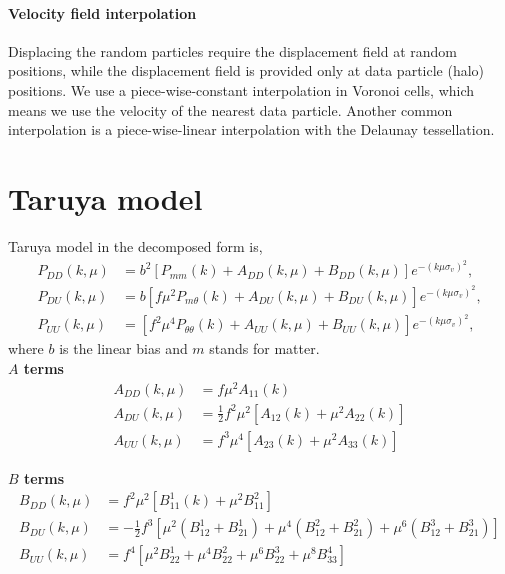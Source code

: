 \documentclass[a4paper,11pt, fleqn]{article}
\begin{document}
\paragraph{Velocity field interpolation}

Displacing the random particles require the displacement field at
random positions, while the displacement field is provided only at
data particle (halo) positions. We use a piece-wise-constant
interpolation in Voronoi cells, which means we use the velocity of the
nearest data particle. Another common interpolation is a
piece-wise-linear interpolation with the Delaunay tessellation.


%
%
\newpage
\section{Taruya model}

\vspace{5mm}

Taruya model in the decomposed form is,\vspace{-2mm}
\begin{align}
  P_{DD}(k, \mu) &= b^2 \left[
    P_{mm}(k) + A_{DD}(k, \mu) + B_{DD}(k, \mu)
    \right] e^{- (k\mu\sigma_v)^2},\\
  P_{DU}(k, \mu) &= b \left[
    f\mu^2 P_{m\theta}(k) + A_{DU}(k, \mu) + B_{DU}(k, \mu)
    \right] e^{- (k\mu\sigma_v)^2},\\
  P_{UU}(k, \mu) &= \left[
    f^2 \mu^4 P_{\theta\theta}(k) + A_{UU}(k, \mu) + B_{UU}(k, \mu)
    \right] e^{- (k\mu\sigma_v)^2},   
\end{align}
where $b$ is the linear bias and $m$ stands for matter.\\


\textbf{$A$ terms}\vspace{-2mm}
\begin{align}
  A_{DD}(k, \mu) &= f\mu^2 A_{11}(k)\\
  A_{DU}(k, \mu) &= \frac{1}{2} f^2 \mu^2 \left[
                   A_{12}(k) + \mu^2 A_{22}(k) \right]\\
  A_{UU}(k, \mu) &= f^3 \mu^4 \left[ A_{23}(k) + \mu^2 A_{33}(k) \right]
\end{align}

\textbf{$B$ terms}\vspace{-2mm}
\begin{align}
  B_{DD}(k, \mu) &= f^2 \mu^2 \left[ B^1_{11}(k) + \mu^2 B^2_{11} \right]\\
  B_{DU}(k, \mu) &= -\frac{1}{2} f^3 \left[
    \mu^2( B^1_{12} + B^1_{21} ) + \mu^4(B^2_{12} + B^2_{21})
    + \mu^6(B^3_{12} + B^3_{21}) \right]\\
  B_{UU}(k, \mu) &= f^4 \left[ \mu^2 B^1_{22} + \mu^4 B^2_{22} + \mu^6
    B^3_{22} + \mu^8 B^4_{33}\right]
\end{align}
\end{document}
